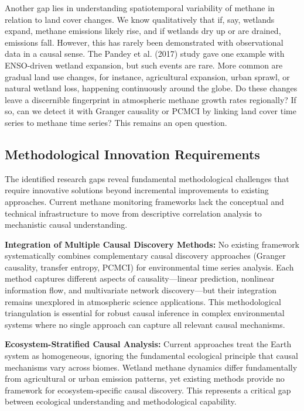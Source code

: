 Another gap lies in understanding spatiotemporal variability of methane in relation to land cover changes. We know qualitatively that if, say, wetlands expand, methane emissions likely rise, and if wetlands dry up or are drained, emissions fall. However, this has rarely been demonstrated with observational data in a causal sense. The Pandey et al. (2017) \cite{Pandey2017} study gave one example with ENSO-driven wetland expansion, but such events are rare. More common are gradual land use changes, for instance, agricultural expansion, urban sprawl, or natural wetland loss, happening continuously around the globe. Do these changes leave a discernible fingerprint in atmospheric methane growth rates regionally? If so, can we detect it with Granger causality or PCMCI by linking land cover time series to methane time series? This remains an open question.

\subsection{Methodological Innovation Requirements}
\label{subsec:methodological-innovation-needs}

The identified research gaps reveal fundamental methodological challenges that require innovative solutions beyond incremental improvements to existing approaches. Current methane monitoring frameworks lack the conceptual and technical infrastructure to move from descriptive correlation analysis to mechanistic causal understanding.

\textbf{Integration of Multiple Causal Discovery Methods:} No existing framework systematically combines complementary causal discovery approaches (Granger causality, transfer entropy, PCMCI) for environmental time series analysis. Each method captures different aspects of causality—linear prediction, nonlinear information flow, and multivariate network discovery—but their integration remains unexplored in atmospheric science applications. This methodological triangulation is essential for robust causal inference in complex environmental systems where no single approach can capture all relevant causal mechanisms.

\textbf{Ecosystem-Stratified Causal Analysis:} Current approaches treat the Earth system as homogeneous, ignoring the fundamental ecological principle that causal mechanisms vary across biomes. Wetland methane dynamics differ fundamentally from agricultural or urban emission patterns, yet existing methods provide no framework for ecosystem-specific causal discovery. This represents a critical gap between ecological understanding and methodological capability.

